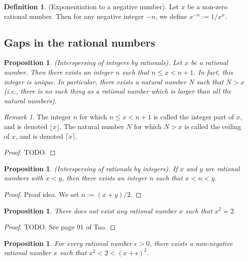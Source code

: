 \documentclass[12pt]{article}
\newtheorem{proposition}[theorem]{Proposition}
\theoremstyle{definition}
\newtheorem{definition}[theorem]{Definition}
\theoremstyle{remark}
\newtheorem*{remark}{Remark}
\begin{document}
\begin{definition}
    (Exponentiation to a negative number). Let $x$ be a non-zero rational number. Then for any negative integer $-n$, we define $x^{-n} := 1/x^n$.
\end{definition}

\subsection{Gaps in the rational numbers}

\begin{proposition}
    (Interspersing of integers by rationals). Let $x$ be a rational number. Then there exists an integer $n$ such that $n \leq x < n+1$. In fact, this integer is unique. In particular, there exists a natural number $N$ such that $N>x$ (i.e., there is no such thing as a rational number which is larger than all the natural numbers).
\end{proposition}

\begin{remark}
    The integer $n$ for which $n \leq x < n+1$ is called the integer part of $x$, and is denoted $\lfloor x \rfloor$. The natural number $N$ for which $N > x$ is called the ceiling of $x$, and is denoted $\lceil x \rceil$.
\end{remark}

\begin{proof}
    TODO.
\end{proof}

\begin{proposition}
    (Interspersing of rationals by integers). If $x$ and $y$ are rational numbers with $x < y$, then there exists an integer $n$ such that $x < n < y$.
\end{proposition}

\begin{proof}
    Proof idea. We set $n := (x+y)/2$.
\end{proof}

\begin{proposition}
    There does not exist any rational number $x$ such that $x^2 = 2$.
\end{proposition}

\begin{proof}
    TODO. See page 91 of Tao.
\end{proof}

\begin{proposition}
    For every rational number $\epsilon > 0$, there exists a non-negative rational number $x$ such that $x^2 < 2 < (x + \epsilon)^2$.
\end{proposition}
\end{document}
